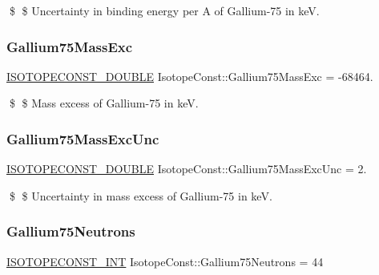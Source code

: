 \$ \$ Uncertainty in binding energy per A of Gallium-\/75 in keV. \mbox{\label{group___isotope_const-_gallium-_ga75_ga5b2057aada90938b63e02c3b8c03e171}} 
\subsubsection{\texorpdfstring{Gallium75\+Mass\+Exc}{Gallium75MassExc}}
{\footnotesize\ttfamily \mbox{\hyperlink{group___isotope_const-_macros_ga8f45a7272ce02c0b4c65c44636ed719a}{I\+S\+O\+T\+O\+P\+E\+C\+O\+N\+S\+T\+\_\+\+D\+O\+U\+B\+LE}} Isotope\+Const\+::\+Gallium75\+Mass\+Exc = -\/68464.}

\$ \$ Mass excess of Gallium-\/75 in keV. \mbox{\label{group___isotope_const-_gallium-_ga75_gae6d36512d207c3962f084f263435050f}} 
\subsubsection{\texorpdfstring{Gallium75\+Mass\+Exc\+Unc}{Gallium75MassExcUnc}}
{\footnotesize\ttfamily \mbox{\hyperlink{group___isotope_const-_macros_ga8f45a7272ce02c0b4c65c44636ed719a}{I\+S\+O\+T\+O\+P\+E\+C\+O\+N\+S\+T\+\_\+\+D\+O\+U\+B\+LE}} Isotope\+Const\+::\+Gallium75\+Mass\+Exc\+Unc = 2.}

\$ \$ Uncertainty in mass excess of Gallium-\/75 in keV. \mbox{\label{group___isotope_const-_gallium-_ga75_ga8baf93a2d97ac766af32320ee268b630}} 
\subsubsection{\texorpdfstring{Gallium75\+Neutrons}{Gallium75Neutrons}}
{\footnotesize\ttfamily \mbox{\hyperlink{group___isotope_const-_macros_ga5f18360b3e99483a35c32d789e62621c}{I\+S\+O\+T\+O\+P\+E\+C\+O\+N\+S\+T\+\_\+\+I\+NT}} Isotope\+Const\+::\+Gallium75\+Neutrons = 44}

